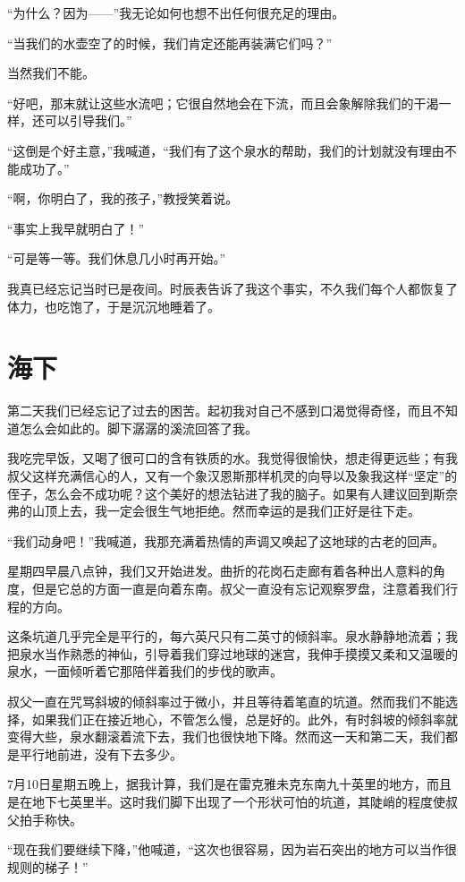 \documentclass[10pt]{book}
\begin{document}
“为什么？因为——”我无论如何也想不出任何很充足的理由。

“当我们的水壶空了的时候，我们肯定还能再装满它们吗？”

当然我们不能。

“好吧，那末就让这些水流吧；它很自然地会在下流，而且会象解除我们的干渴一样，还可以引导我们。”

“这倒是个好主意，”我喊道，“我们有了这个泉水的帮助，我们的计划就没有理由不能成功了。”

“啊，你明白了，我的孩子，”教授笑着说。

“事实上我早就明白了！”

“可是等一等。我们休息几小时再开始。”

我真已经忘记当时已是夜间。时辰表告诉了我这个事实，不久我们每个人都恢复了体力，也吃饱了，于是沉沉地睡着了。
\chapter{海下}
第二天我们已经忘记了过去的困苦。起初我对自己不感到口渴觉得奇怪，而且不知道怎么会如此的。脚下潺潺的溪流回答了我。

我吃完早饭，又喝了很可口的含有铁质的水。我觉得很愉快，想走得更远些；有我叔父这样充满信心的人，又有一个象汉恩斯那样机灵的向导以及象我这样“坚定”的侄子，怎么会不成功呢？这个美好的想法钻进了我的脑子。如果有人建议回到斯奈弗的山顶上去，我一定会很生气地拒绝。然而幸运的是我们正好是往下走。

“我们动身吧！”我喊道，我那充满着热情的声调又唤起了这地球的古老的回声。

星期四早晨八点钟，我们又开始进发。曲折的花岗石走廊有着各种出人意料的角度，但是它总的方面一直是向着东南。叔父一直没有忘记观察罗盘，注意着我们行程的方向。

这条坑道几乎完全是平行的，每六英尺只有二英寸的倾斜率。泉水静静地流着；我把泉水当作熟悉的神仙，引导着我们穿过地球的迷宫，我伸手摸摸又柔和又温暖的泉水，一面倾听着它那陪伴着我们的步伐的歌声。

叔父一直在咒骂斜坡的倾斜率过于微小，并且等待着笔直的坑道。然而我们不能选择，如果我们正在接近地心，不管怎么慢，总是好的。此外，有时斜坡的倾斜率就变得大些，泉水翻滚着流下去，我们也很快地下降。然而这一天和第二天，我们都是平行地前进，没有下去多少。

7月10日星期五晚上，据我计算，我们是在雷克雅未克东南九十英里的地方，而且是在地下七英里半。这时我们脚下出现了一个形状可怕的坑道，其陡峭的程度使叔父拍手称快。

“现在我们要继续下降，”他喊道，“这次也很容易，因为岩石突出的地方可以当作很规则的梯子！”
\end{document}
